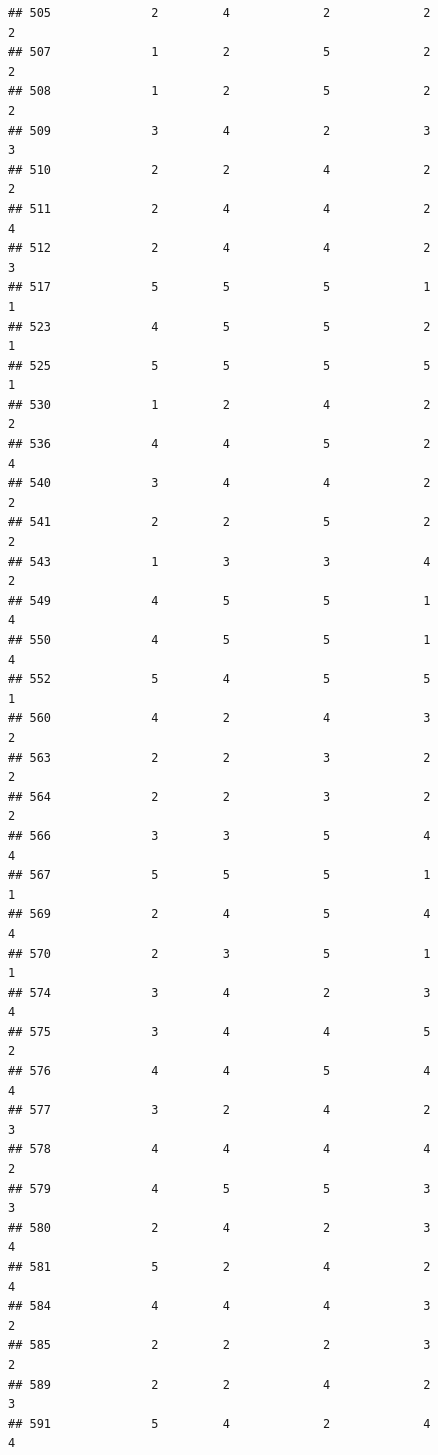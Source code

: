 \documentclass[
]{article}
\begin{document}
\begin{verbatim}
## 505              2         4             2             2           2
## 507              1         2             5             2           2
## 508              1         2             5             2           2
## 509              3         4             2             3           3
## 510              2         2             4             2           2
## 511              2         4             4             2           4
## 512              2         4             4             2           3
## 517              5         5             5             1           1
## 523              4         5             5             2           1
## 525              5         5             5             5           1
## 530              1         2             4             2           2
## 536              4         4             5             2           4
## 540              3         4             4             2           2
## 541              2         2             5             2           2
## 543              1         3             3             4           2
## 549              4         5             5             1           4
## 550              4         5             5             1           4
## 552              5         4             5             5           1
## 560              4         2             4             3           2
## 563              2         2             3             2           2
## 564              2         2             3             2           2
## 566              3         3             5             4           4
## 567              5         5             5             1           1
## 569              2         4             5             4           4
## 570              2         3             5             1           1
## 574              3         4             2             3           4
## 575              3         4             4             5           2
## 576              4         4             5             4           4
## 577              3         2             4             2           3
## 578              4         4             4             4           2
## 579              4         5             5             3           3
## 580              2         4             2             3           4
## 581              5         2             4             2           4
## 584              4         4             4             3           2
## 585              2         2             2             3           2
## 589              2         2             4             2           3
## 591              5         4             2             4           4

\end{verbatim}
\end{document}
